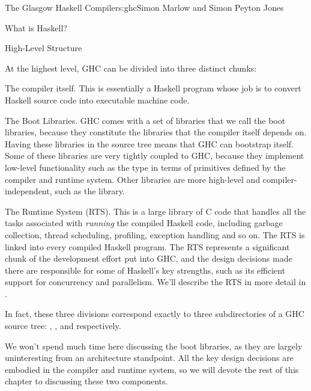 \begin{aosachapter}{The Glasgow Haskell Compiler}{s:ghc}{Simon Marlow and Simon Peyton Jones}
\begin{aosasect1}{What is Haskell?}
\end{aosasect1}

\begin{aosasect1}{High-Level Structure}

At the highest level, GHC can be divided into three distinct chunks:

\begin{aosaitemize}

\item The compiler itself.  This is essentially a Haskell program
  whose job is to convert Haskell source code into executable machine
  code.

\item The Boot Libraries.  GHC comes with a set of libraries that we
  call the boot libraries, because they constitute the libraries that
  the compiler itself depends on.  Having these libraries in the
  source tree means that GHC can bootstrap itself.  Some of these
  libraries are very tightly coupled to GHC, because they implement
  low-level functionality such as the  type in terms of
  primitives defined by the compiler and runtime system.  Other
  libraries are more high-level and compiler-independent, such as the
   library.

\item The Runtime System (RTS).  This is
  a large library of C code that handles all the tasks associated with
  \emph{running} the compiled Haskell code, including garbage
  collection, thread scheduling, profiling, exception handling and so
  on.  The RTS is linked into every compiled Haskell program.  The RTS
  represents a significant chunk of the development effort put into
  GHC, and the design decisions made there are responsible for some of
  Haskell's key strengths, such as its efficient support for
  concurrency and parallelism.  We'll describe the RTS in more detail
  in .

\end{aosaitemize}

In fact, these three divisions correspond exactly to three
subdirectories of a GHC source tree: ,
, and  respectively.

We won't spend much time here discussing the boot libraries, as they
are largely uninteresting from an architecture standpoint.  All the
key design decisions are embodied in the compiler and runtime system,
so we will devote the rest of this chapter to discussing these two
components.


\end{aosasect1}
\end{aosachapter}
